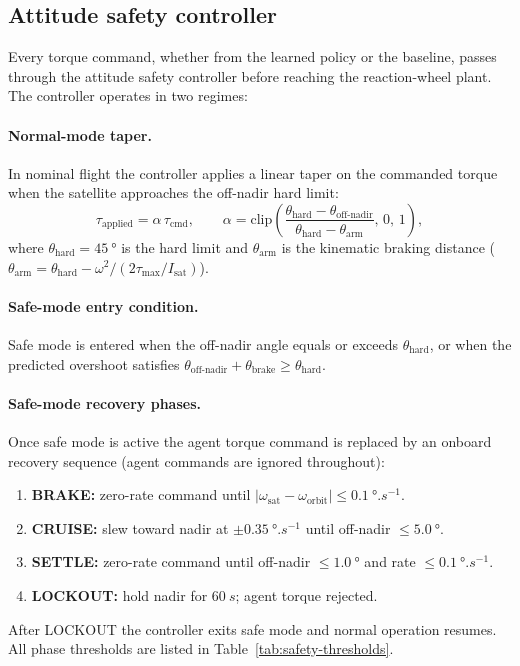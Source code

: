 \subsection{Attitude safety controller}
\label{sec:safety}

Every torque command, whether from the learned policy or the baseline, passes through the
attitude safety controller before reaching the reaction-wheel plant.
The controller operates in two regimes:

\paragraph{Normal-mode taper.}
In nominal flight the controller applies a linear taper on the commanded torque when the satellite approaches the off-nadir hard limit:
\begin{equation}
  \tau_\text{applied} = \alpha\,\tau_\text{cmd}, \qquad
  \alpha = \mathrm{clip}\!\left(\frac{\theta_\text{hard} - \theta_\text{off-nadir}}{\theta_\text{hard} - \theta_\text{arm}},\,0,\,1\right),
\end{equation}
where $\theta_\text{hard}=\SI{45}{\degree}$ is the hard limit and $\theta_\text{arm}$ is the kinematic braking distance
($\theta_\text{arm}=\theta_\text{hard} - \omega^2/(2\tau_\text{max}/I_\text{sat})$).

\paragraph{Safe-mode entry condition.}
Safe mode is entered when the off-nadir angle equals or exceeds $\theta_\text{hard}$, or when the predicted
overshoot satisfies $\theta_\text{off-nadir} + \theta_\text{brake} \ge \theta_\text{hard}$.

\paragraph{Safe-mode recovery phases.}
Once safe mode is active the agent torque command is replaced by an onboard recovery sequence
(agent commands are ignored throughout):
\begin{enumerate}
  \item \textbf{BRAKE:} zero-rate command until $|\omega_\text{sat}-\omega_\text{orbit}|\le\SI{0.1}{\degree.s^{-1}}$.
  \item \textbf{CRUISE:} slew toward nadir at $\pm\SI{0.35}{\degree.s^{-1}}$ until off-nadir $\le\SI{5.0}{\degree}$.
  \item \textbf{SETTLE:} zero-rate command until off-nadir $\le\SI{1.0}{\degree}$ and rate $\le\SI{0.1}{\degree.s^{-1}}$.
  \item \textbf{LOCKOUT:} hold nadir for $\SI{60}{s}$; agent torque rejected.
\end{enumerate}
After LOCKOUT the controller exits safe mode and normal operation resumes.
All phase thresholds are listed in Table~\ref{tab:safety-thresholds}.


